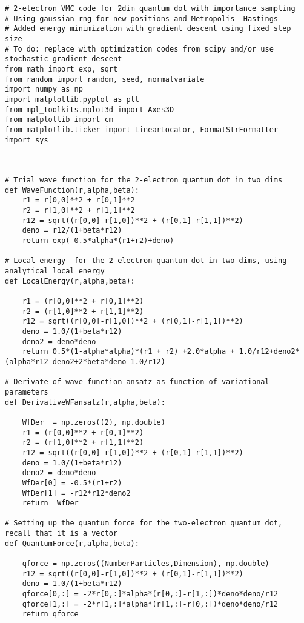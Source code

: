 \documentclass[%
oneside,                 %
final,                   %
10pt]{article}
\begin{document}
\begin{verbatim}
# 2-electron VMC code for 2dim quantum dot with importance sampling
# Using gaussian rng for new positions and Metropolis- Hastings 
# Added energy minimization with gradient descent using fixed step size
# To do: replace with optimization codes from scipy and/or use stochastic gradient descent
from math import exp, sqrt
from random import random, seed, normalvariate
import numpy as np
import matplotlib.pyplot as plt
from mpl_toolkits.mplot3d import Axes3D
from matplotlib import cm
from matplotlib.ticker import LinearLocator, FormatStrFormatter
import sys



# Trial wave function for the 2-electron quantum dot in two dims
def WaveFunction(r,alpha,beta):
    r1 = r[0,0]**2 + r[0,1]**2
    r2 = r[1,0]**2 + r[1,1]**2
    r12 = sqrt((r[0,0]-r[1,0])**2 + (r[0,1]-r[1,1])**2)
    deno = r12/(1+beta*r12)
    return exp(-0.5*alpha*(r1+r2)+deno)

# Local energy  for the 2-electron quantum dot in two dims, using analytical local energy
def LocalEnergy(r,alpha,beta):
    
    r1 = (r[0,0]**2 + r[0,1]**2)
    r2 = (r[1,0]**2 + r[1,1]**2)
    r12 = sqrt((r[0,0]-r[1,0])**2 + (r[0,1]-r[1,1])**2)
    deno = 1.0/(1+beta*r12)
    deno2 = deno*deno
    return 0.5*(1-alpha*alpha)*(r1 + r2) +2.0*alpha + 1.0/r12+deno2*(alpha*r12-deno2+2*beta*deno-1.0/r12)

# Derivate of wave function ansatz as function of variational parameters
def DerivativeWFansatz(r,alpha,beta):
    
    WfDer  = np.zeros((2), np.double)
    r1 = (r[0,0]**2 + r[0,1]**2)
    r2 = (r[1,0]**2 + r[1,1]**2)
    r12 = sqrt((r[0,0]-r[1,0])**2 + (r[0,1]-r[1,1])**2)
    deno = 1.0/(1+beta*r12)
    deno2 = deno*deno
    WfDer[0] = -0.5*(r1+r2)
    WfDer[1] = -r12*r12*deno2
    return  WfDer

# Setting up the quantum force for the two-electron quantum dot, recall that it is a vector
def QuantumForce(r,alpha,beta):

    qforce = np.zeros((NumberParticles,Dimension), np.double)
    r12 = sqrt((r[0,0]-r[1,0])**2 + (r[0,1]-r[1,1])**2)
    deno = 1.0/(1+beta*r12)
    qforce[0,:] = -2*r[0,:]*alpha*(r[0,:]-r[1,:])*deno*deno/r12
    qforce[1,:] = -2*r[1,:]*alpha*(r[1,:]-r[0,:])*deno*deno/r12
    return qforce
    


\end{verbatim}
\end{document}
